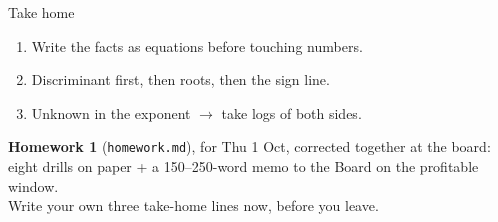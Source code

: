 \documentclass[aspectratio=169,11pt]{beamer}
\begin{document}
\begin{frame}{Take home}
  \begin{enumerate}
    \item Write the facts as equations before touching numbers.
    \item Discriminant first, then roots, then the sign line.
    \item Unknown in the exponent $\rightarrow$ take logs of both sides.
  \end{enumerate}
  \vspace{0.8em}
  \textbf{Homework 1} (\texttt{homework.md}), for Thu 1 Oct, corrected together at the board: eight drills on paper + a 150--250-word memo to the Board on the profitable window.\\[0.6em]
  Write your own three take-home lines now, before you leave.
\end{frame}
\end{document}
